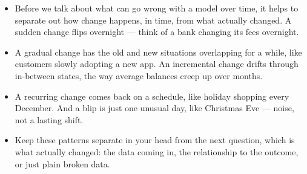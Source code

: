 \documentclass[11pt,a4paper]{article}
\begin{document}
\begin{examplebox}[title after break={SPOKEN SCRIPT --- slide 15 continued}]
\begin{itemize}
\item Before we talk about what can go wrong with a model over time, it helps to separate out how change happens, in time, from what actually changed. A sudden change flips overnight — think of a bank changing its fees overnight.
\item A gradual change has the old and new situations overlapping for a while, like customers slowly adopting a new app. An incremental change drifts through in-between states, the way average balances creep up over months.
\item A recurring change comes back on a schedule, like holiday shopping every December. And a blip is just one unusual day, like Christmas Eve — noise, not a lasting shift.
\item Keep these patterns separate in your head from the next question, which is what actually changed: the data coming in, the relationship to the outcome, or just plain broken data.
\end{itemize}
\end{examplebox}
\par\noindent{\scriptsize\textcolor{teal!60!black}{Reading anchor: Krawczyk \& Cano (2018), Fig. 2 · Original figure; attribution and source link in guide}}
\clearpage
\end{document}

